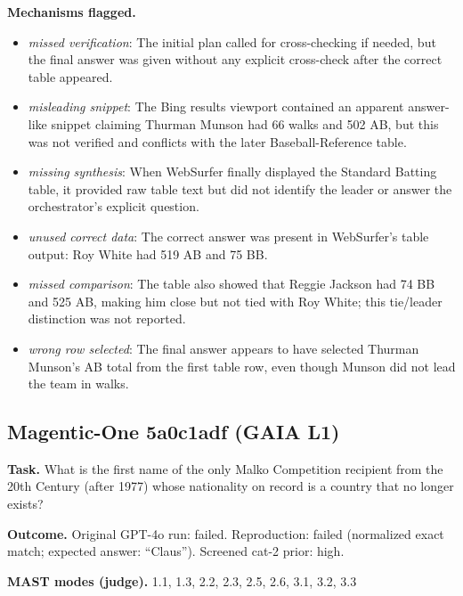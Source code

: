 \textbf{Mechanisms flagged.}
\begin{itemize}
  \item \emph{missed verification}: The initial plan called for cross-checking if needed, but the final answer was given without any explicit cross-check after the correct table appeared.
  \item \emph{misleading snippet}: The Bing results viewport contained an apparent answer-like snippet claiming Thurman Munson had 66 walks and 502 AB, but this was not verified and conflicts with the later Baseball-Reference table.
  \item \emph{missing synthesis}: When WebSurfer finally displayed the Standard Batting table, it provided raw table text but did not identify the leader or answer the orchestrator's explicit question.
  \item \emph{unused correct data}: The correct answer was present in WebSurfer's table output: Roy White had 519 AB and 75 BB.
  \item \emph{missed comparison}: The table also showed that Reggie Jackson had 74 BB and 525 AB, making him close but not tied with Roy White; this tie/leader distinction was not reported.
  \item \emph{wrong row selected}: The final answer appears to have selected Thurman Munson's AB total from the first table row, even though Munson did not lead the team in walks.
\end{itemize}

\subsection*{Magentic-One 5a0c1adf (GAIA L1)}
\textbf{Task.} What is the first name of the only Malko Competition recipient from the 20th Century (after 1977) whose nationality on record is a country that no longer exists?

\textbf{Outcome.} Original GPT-4o run: failed. Reproduction: failed (normalized exact match; expected answer: ``Claus''). Screened cat-2 prior: high.

\textbf{MAST modes (judge).} 1.1, 1.3, 2.2, 2.3, 2.5, 2.6, 3.1, 3.2, 3.3


